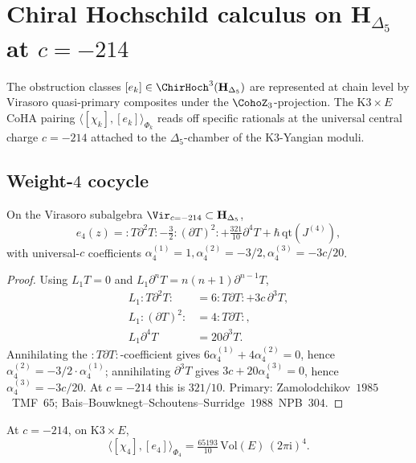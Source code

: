 \chapter{Chiral Hochschild calculus on $\mathbf H_{\Delta_5}$ at
$c=-214$}
\label{chap:hochschild-calculus}

The obstruction classes $[e_k]\in\ChirHoch^3(\mathbf H_{\Delta_5})$
are represented at chain level by Virasoro quasi-primary composites
under the $\CohoZ_3$-projection. The K$3\times E$ CoHA pairing
$\langle[\chi_k],[e_k]\rangle_{\Phi_k}$ reads off specific rationals
at the universal central charge $c=-214$ attached to the
$\Delta_5$-chamber of the $\mathrm K3$-Yangian moduli.

\section{Weight-$4$ cocycle}
\label{sec:e4-calculus}

\begin{theorem}
\label{thm:e4-vol3}
\ClaimStatusProvedHere
On the Virasoro subalgebra $\Vir_{c=-214}\subset\mathbf H_{\Delta_5}$,
\begin{equation}
\label{eq:e4-vol3}
e_4(z)={:}T\partial^2T{:}-\tfrac{3}{2}{:}(\partial T)^2{:}
     +\tfrac{321}{10}\partial^4T+\hbar\,\mathrm{qt}(J^{(4)}),
\end{equation}
with universal-$c$ coefficients
$\alpha_4^{(1)}=1,\alpha_4^{(2)}=-3/2,\alpha_4^{(3)}=-3c/20$.
\end{theorem}

\begin{proof}
Using $L_1T=0$ and $L_1\partial^nT=n(n+1)\partial^{n-1}T$,
\begin{align*}
L_1{:}T\partial^2T{:}&=6{:}T\partial T{:}+3c\,\partial^3T,\\
L_1{:}(\partial T)^2{:}&=4{:}T\partial T{:},\\
L_1\partial^4T&=20\partial^3T.
\end{align*}
Annihilating the ${:}T\partial T{:}$-coefficient gives
$6\alpha_4^{(1)}+4\alpha_4^{(2)}=0$, hence
$\alpha_4^{(2)}=-3/2\cdot\alpha_4^{(1)}$; annihilating
$\partial^3T$ gives
$3c+20\alpha_4^{(3)}=0$, hence
$\alpha_4^{(3)}=-3c/20$. At $c=-214$ this is $321/10$.
Primary: Zamolodchikov~$1985$~TMF~$65$;
Bais--Bouwknegt--Schoutens--Surridge~$1988$~NPB~$304$.
\end{proof}

\begin{theorem}
\label{thm:chi4-e4-vol3}
\ClaimStatusProvedHere
At $c=-214$, on K$3\times E$,
\begin{equation}
\label{eq:chi4-e4-pairing-vol3}
\langle[\chi_4],[e_4]\rangle_{\Phi_4}
=\tfrac{65193}{10}\,\mathrm{Vol}(E)\,(2\pi\mathrm i)^4.
\end{equation}
\end{theorem}

